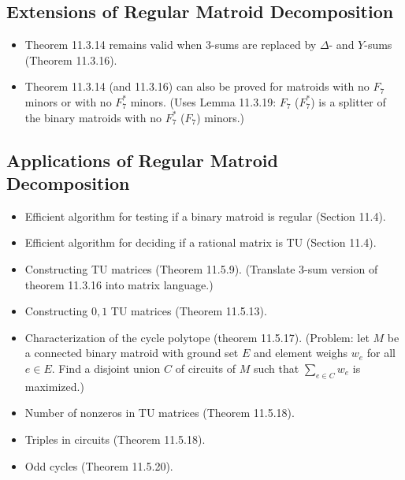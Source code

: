 \subsection{Extensions of Regular Matroid Decomposition}

\begin{itemize}
  \item Theorem 11.3.14 remains valid when $3$-sums are replaced by $\Delta$- and $Y$-sums (Theorem 11.3.16).
  \item Theorem 11.3.14 (and 11.3.16) can also be proved for matroids with no $F_{7}$ minors or with no $F_{7}^{*}$ minors. (Uses Lemma 11.3.19: $F_{7}$ ($F_{7}^{*}$) is a splitter of the binary matroids with no $F_{7}^{*}$ ($F_{7}$) minors.)
\end{itemize}


\subsection{Applications of Regular Matroid Decomposition}

\begin{itemize}
  \item Efficient algorithm for testing if a binary matroid is regular (Section 11.4).
  \item Efficient algorithm for deciding if a rational matrix is TU (Section 11.4).
  \item Constructing TU matrices (Theorem 11.5.9). (Translate $3$-sum version of theorem 11.3.16 into matrix language.)
  \item Constructing ${0, 1}$ TU matrices (Theorem 11.5.13).
  \item Characterization of the cycle polytope (theorem 11.5.17). (Problem: let $M$ be a connected binary matroid with ground set $E$ and element weighs $w_{e}$ for all $e \in E$. Find a disjoint union $C$ of circuits of $M$ such that $\sum_{e \in C} w_{e}$ is maximized.)
  \item Number of nonzeros in TU matrices (Theorem 11.5.18).
  \item Triples in circuits (Theorem 11.5.18).
  \item Odd cycles (Theorem 11.5.20).
\end{itemize}
